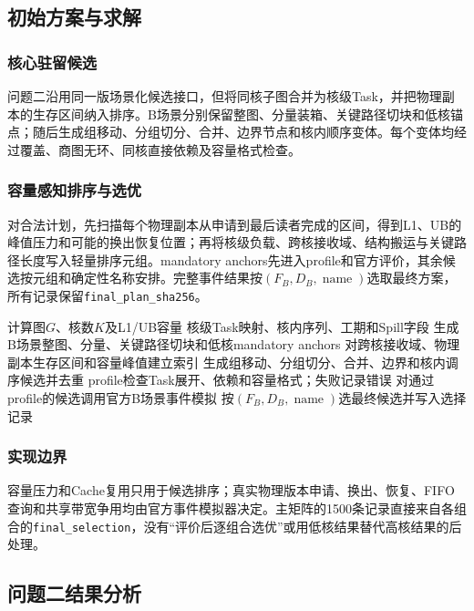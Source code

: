 \subsection{初始方案与求解}
\subsubsection{核心驻留候选}
问题二沿用同一版场景化候选接口，但将同核子图合并为核级Task，并把物理副本的生存区间纳入排序。B场景分别保留整图、分量装箱、关键路径切块和低核锚点；随后生成组移动、分组切分、合并、边界节点和核内顺序变体。每个变体均经过覆盖、商图无环、同核直接依赖及容量格式检查。

\subsubsection{容量感知排序与选优}
对合法计划，先扫描每个物理副本从申请到最后读者完成的区间，得到L1、UB的峰值压力和可能的换出恢复位置；再将核级负载、跨核接收域、结构搬运与关键路径长度写入轻量排序元组。mandatory anchors先进入profile和官方评价，其余候选按元组和确定性名称安排。完整事件结果按$(F_B,D_B,\operatorname{name})$选取最终方案，所有记录保留\texttt{final\_plan\_sha256}。

\begin{algorithm}[H]
\caption{问题二核心驻留与容量约束求解}
\begin{algorithmic}[1]
\REQUIRE 计算图$G$、核数$K$及L1/UB容量
\ENSURE 核级Task映射、核内序列、工期和Spill字段
\STATE 生成B场景整图、分量、关键路径切块和低核mandatory anchors
\STATE 对跨核接收域、物理副本生存区间和容量峰值建立索引
\STATE 生成组移动、分组切分、合并、边界和核内调序候选并去重
\STATE profile检查Task展开、依赖和容量格式；失败记录错误
\STATE 对通过profile的候选调用官方B场景事件模拟
\STATE 按$(F_B,D_B,\operatorname{name})$选最终候选并写入选择记录
\end{algorithmic}
\end{algorithm}

\subsubsection{实现边界}
容量压力和Cache复用只用于候选排序；真实物理版本申请、换出、恢复、FIFO查询和共享带宽争用均由官方事件模拟器决定。主矩阵的1500条记录直接来自各组合的\texttt{final\_selection}，没有“评价后逐组合选优”或用低核结果替代高核结果的后处理。

\subsection{问题二结果分析}
